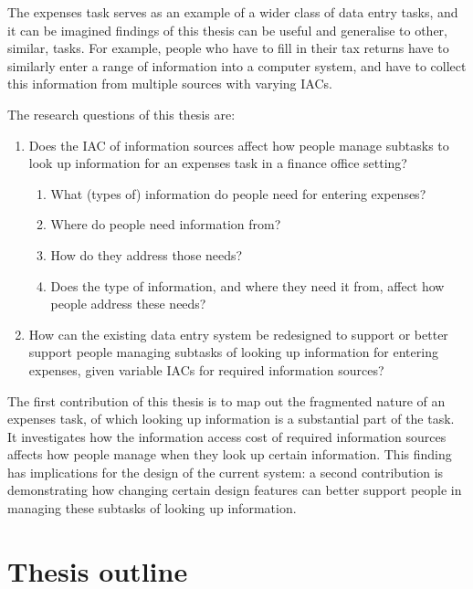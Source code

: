 The expenses task serves as an example of a wider class of data entry tasks, and it can be imagined findings of this thesis can be useful and generalise to other, similar, tasks. For example, people who have to fill in their tax returns have to similarly enter a range of information into a computer system, and have to collect this information from multiple sources with varying IACs.

The research questions of this thesis are:

\begin{enumerate}
\item Does the IAC of information sources affect how people manage subtasks to look up information for an expenses task in a finance office setting?
\begin{enumerate}
\item	What (types of) information do people need for entering expenses?
\item	Where do people need information from?
\item	How do they address those needs?
\item	Does the type of information, and where they need it from, affect how people address these needs?
\end{enumerate}
\item	How can the existing data entry system be redesigned to support or better support people managing subtasks of looking up information for entering expenses, given variable IACs for required information sources?
\end{enumerate}


The first contribution of this thesis is to map out the fragmented nature of an expenses task, of which looking up information is a substantial part of the task. It investigates how the information access cost of required information sources affects how people manage when they look up certain information. This finding has implications for the design of the current system: a second contribution is demonstrating how changing certain design features can better support people in managing these subtasks of looking up information.

\section{Thesis outline}

